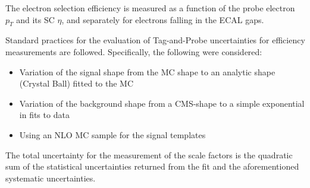 The electron selection efficiency is measured as a function of the probe electron $p_{T}$ and its SC $\eta$, and separately for electrons falling in the ECAL gaps.



Standard practices for the evaluation of Tag-and-Probe uncertainties for efficiency measurements are followed. Specifically, the following were considered:

\begin{itemize}
   \item Variation of the signal shape from the MC shape to an analytic shape (Crystal Ball) fitted to the MC
   \item Variation of the background shape from a CMS-shape to a simple exponential in fits to data
   \item Using an NLO MC sample for the signal templates
\end{itemize}

The total uncertainty for the measurement of the scale factors is the quadratic sum of the statistical uncertainties returned from the fit and the aforementioned systematic uncertainties.

